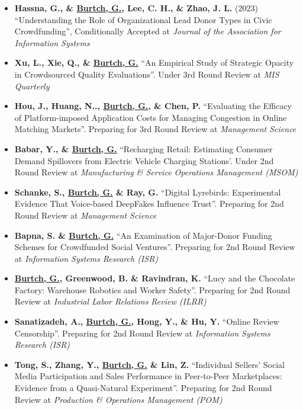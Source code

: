 \documentclass[10.5pt,letterpaper,sans]{moderncv}        %
\begin{document}
\begin{itemize}[leftmargin=!,labelindent=5pt,itemindent=-15pt]

\item \textbf{Hassna, G., \& \underline{Burtch, G.}, Lee, C. H., \& Zhao, J. L.} (2023) ``Understanding the Role of Organizational Lead Donor Types in Civic Crowdfunding'', Conditionally Accepted at \textit{Journal of the Association for Information Systems}

\item \textbf{Xu, L., Xie, Q., \& \underline{Burtch, G.}} ``An Empirical Study of Strategic Opacity in Crowdsourced Quality Evaluations''. Under 3rd Round Review at \textit{MIS Quarterly}

\item \textbf{Hou, J., Huang, N.., \underline{Burtch, G.}, \& Chen, P.} ``Evaluating the Efficacy of Platform-imposed Application Costs for Managing Congestion in Online Matching Markets''. Preparing for 3rd Round Review at \textit{Management Science} 

\item \textbf{Babar, Y., \& \underline{Burtch, G.}} ``Recharging Retail: Estimating Consumer Demand Spillovers from Electric Vehicle Charging Stations'. Under 2nd Round Review at \textit{Manufacturing \& Service Operations Management (MSOM)} 

\item \textbf{Schanke, S.,  \underline{Burtch, G.} \& Ray, G.} ``Digital Lyrebirds: Experimental Evidence That Voice-based DeepFakes Influence Trust''. Preparing for 2nd Round Review at \textit{Management Science} 

\item \textbf{Bapna, S. \& \underline{Burtch, G.}} ``An Examination of Major-Donor Funding Schemes for Crowdfunded Social Ventures''. Preparing for 2nd Round Review at \textit{Information Systems Research (ISR)}

\item \textbf{\underline{Burtch, G.}, Greenwood, B. \& Ravindran, K.} ``Lucy and the Chocolate Factory: Warehouse Robotics and Worker Safety''. Preparing for 2nd Round Review at \textit{Industrial Labor Relations Review (ILRR)} 

\item \textbf{Sanatizadeh, A., \underline{Burtch, G.}, Hong, Y., \& Hu, Y.} ``Online Review Censorship''. Preparing for 2nd Round Review at \textit{Information Systems Research (ISR)}

\item \textbf{Tong, S., Zhang, Y.,  \underline{Burtch, G.} \& Lin, Z.} ``Individual Sellers' Social Media Participation and Sales Performance in Peer-to-Peer Marketplaces: Evidence from a Quasi-Natural Experiment''. Preparing for 2nd Round Review at \textit{Production \& Operations Management (POM)} 

\end{itemize}
\end{document}
